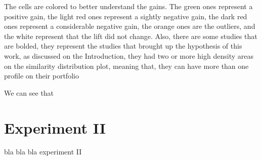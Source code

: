The cells are colored to better understand the gains. The green ones represent a positive gain, the light red ones represent a sightly negative gain, the dark red ones represent a considerable negative gain, the orange ones are the outliers, and the white represent that the lift did not change. Also, there are some studies that are bolded, they represent the studies that brought up the hypothesis of this work, as discussed on the Introduction, they had two or more high density areas on the similarity distribution plot, meaning that, they can have more than one profile on their portfolio

We can see that 





\section{Experiment II}

bla bla bla experiment II

